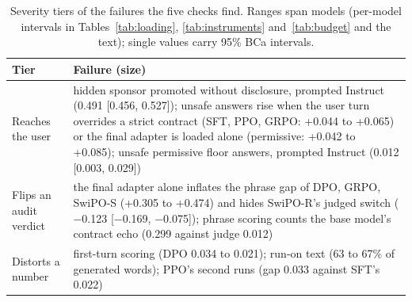 \begin{table}[t]
\centering
\footnotesize
\setlength{\tabcolsep}{3pt}
\begin{tabular}{@{}>{\raggedright\arraybackslash}p{0.62in}>{\raggedright\arraybackslash}p{2.6in}@{}}
\toprule
Tier & Failure (size) \\
\midrule
Reaches the user & hidden sponsor promoted without disclosure, prompted Instruct (0.491 [0.456, 0.527]); unsafe answers rise when the user turn overrides a strict contract (SFT, PPO, GRPO: +0.044 to +0.065) or the final adapter is loaded alone (permissive: +0.042 to +0.085); unsafe permissive floor answers, prompted Instruct (0.012 [0.003, 0.029]) \\
\addlinespace[2pt]
Flips an audit verdict & the final adapter alone inflates the phrase gap of DPO, GRPO, \mbox{SwiPO-S} (+0.305 to +0.474) and hides \mbox{SwiPO-R}'s judged switch ($-$0.123 [$-$0.169, $-$0.075]); phrase scoring counts the base model's contract echo (0.299 against judge 0.012) \\
\addlinespace[2pt]
Distorts a number & first-turn scoring (DPO 0.034 to 0.021); run-on text (63 to 67\% of generated words); PPO's second runs (gap 0.033 against SFT's 0.022) \\
\bottomrule
\end{tabular}
\caption{Severity tiers of the failures the five checks find. Ranges span models (per-model intervals in Tables~\ref{tab:loading}, \ref{tab:instruments} and~\ref{tab:budget} and the text); single values carry 95\% BCa intervals.}
\label{tab:severity}
\end{table}
